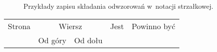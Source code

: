 \documentclass[a4paper,11pt]{article}
\begin{document}
\begin{figure}

  \caption{Przykłady zapisu składania odwzorowań w~notacji strzałkowej.}

\end{figure}










\begin{center}

  \begin{tabular}{|c|c|c|c|c|}
    \hline
    Strona & \multicolumn{2}{c|}{Wiersz} & Jest
                              & Powinno być \\ \cline{2-3}
    & Od góry & Od dołu & & \\
    \hline
    \hline
  \end{tabular}

\end{center}

\vspace{\spaceTwo}

















{}






\end{document}
